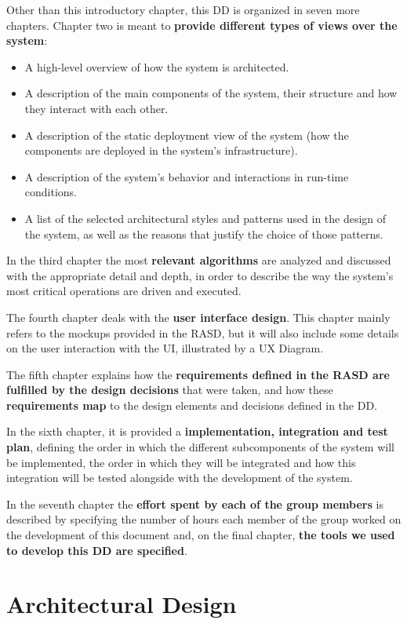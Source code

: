 \documentclass[12pt]{article}
\begin{document}
Other than this introductory chapter, this DD is organized in seven more chapters. Chapter two is meant to \textbf{provide different types of views over the system}:
\begin{itemize}
    \item A high-level overview of how the system is architected.
    \item A description of the main components of the system, their structure and how they interact with each other.
    \item A description of the static deployment view of the system (how the components are deployed in the system's infrastructure). 
    \item A description of the system's behavior and interactions in run-time conditions.
    \item A list of the selected architectural styles and patterns used in the design of the system, as well as the reasons that justify the choice of those patterns.
\end{itemize}

In the third chapter the most \textbf{relevant algorithms} are analyzed and discussed with the appropriate detail and depth, in order to describe the way the system's most critical operations are driven and executed.

The fourth chapter deals with the \textbf{user interface design}. This chapter mainly refers to the mockups provided in the RASD, but it will also include some details on the user interaction with the UI, illustrated by a UX Diagram.

The fifth chapter explains how the \textbf{requirements defined in the RASD are fulfilled by the design decisions} that were taken, and how these \textbf{requirements map} to the design elements and decisions defined in the DD.

In the sixth chapter, it is provided a \textbf{implementation, integration and test plan}, defining the order in which the different subcomponents of the system will be implemented, the order in which they will be integrated and how this integration will be tested alongside with the development of the system.

In the seventh chapter the \textbf{effort spent by each of the group members} is described by specifying the number of hours each member of the group worked on the development of this document and, on the final chapter, \textbf{the tools we used to develop this DD are specified}.


\section{Architectural Design}
\end{document}
